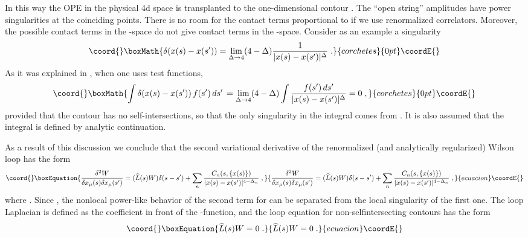 \documentclass[a4paper,12pt]{article}
\numberwithin{equation}{section}
\begin{document}
In this way the OPE in the physical 4d space is transplanted to the one-dimensional
contour \coordHE{}. The ``open string'' amplitudes \coordHE{}
have power singularities at the coinciding points. There is no room for the
contact terms proportional to \coordHE{} if we use renormalized correlators.
Moreover, the possible contact terms in the \coordHE{}-space do not give contact
terms in the \coordHE{}-space. Consider as an example a singularity
\[\coord{}\boxMath{
\delta (x(s)-x(s'))=\lim _{\Delta \to 4}(4-\Delta )\frac{1}{|x(s)-x(s')|^{\Delta }}\; .}{corchetes}{0pt}\coordE{}\]
 As it was explained in \cite{6}, when one uses test functions,
\[\coord{}\boxMath{
\int \delta (x(s)-x(s'))\, f(s')\, ds'\, =\lim _{\Delta \to 4}(4-\Delta )\int \frac{f(s')\, ds'}{|x(s)-x(s')|^{\Delta }}=0\; ,}{corchetes}{0pt}\coordE{}\]
 provided that the contour has no self-intersections, so that the only singularity
in the integral comes from \coordHE{}. It is also assumed that the integral
is defined by analytic continuation.

As a result of this discussion we conclude that the second variational derivative
of the renormalized (and analytically regularized) Wilson loop has the form
\begin{equation}\coord{}\boxEquation{
\label{2.6}
\frac{\delta ^{2}W}{\delta x_{\mu }(s)\delta x_{\mu }(s')}=(\widehat{{L}}(s)W)\delta (s-s')+\sum _{n}\frac{C_{n}(s,\{x(s)\})}{|x(s)-x(s')|^{4-\Delta _{n}}}\; ,
}{
\frac{\delta ^{2}W}{\delta x_{\mu }(s)\delta x_{\mu }(s')}=(\widehat{{L}}(s)W)\delta (s-s')+\sum _{n}\frac{C_{n}(s,\{x(s)\})}{|x(s)-x(s')|^{4-\Delta _{n}}}\; ,
}{ecuacion}\coordE{}\end{equation}
 where \coordHE{}.
Since \coordHE{}, the nonlocal power-like
behavior of the second term for \coordHE{} can be separated from the local
\coordHE{} singularity of the first one. The loop Laplacian is defined as the
coefficient \coordHE{} in front of the \myHighlight{\( \delta  \)}\coordHE{}-function,
and the loop equation for non-selfintersecting contours has the form
\begin{equation}\coord{}\boxEquation{
\label{2.65}
\widehat{L}(s)W=0\; .
}{
\widehat{L}(s)W=0\; .
}{ecuacion}\coordE{}\end{equation}
 
\end{document}
